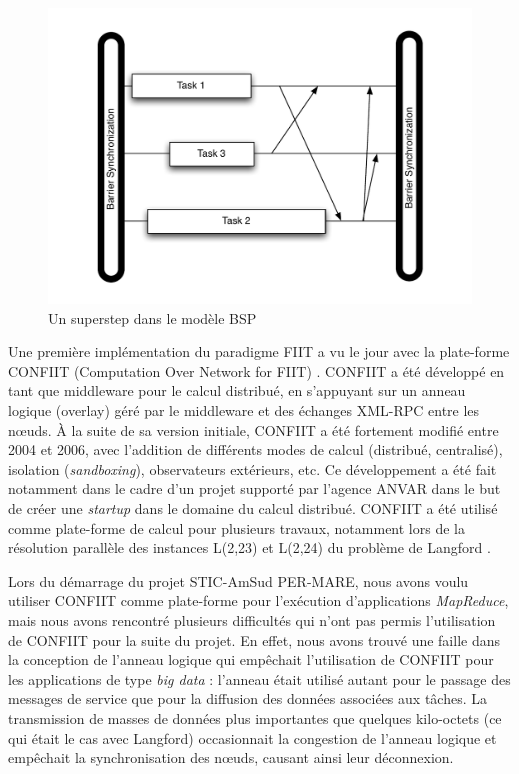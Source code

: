 \begin{figure}
	\centering
		\includegraphics[width=0.5\linewidth]{img/BSP}
		\caption{Un superstep dans le modèle BSP}\label{fig:Superstep}
\end{figure}

Une première implémentation du paradigme FIIT a vu le jour avec la plate-forme CONFIIT (Computation Over Network for FIIT) \cite{FKF03,Flauzac10}. CONFIIT a été développé en tant que middleware pour le calcul distribué, en s'appuyant sur un anneau logique (overlay) géré par le middleware et des échanges XML-RPC entre les n{\oe}uds. À la suite de sa version initiale, CONFIIT a été fortement modifié entre 2004 et 2006, avec l'addition de différents modes de calcul (distribué, centralisé), isolation (\textit{sandboxing}), observateurs extérieurs, etc. Ce développement a été fait notamment dans le cadre d'un projet supporté par l'agence ANVAR dans le but de créer une \textit{startup} dans le domaine du calcul distribué.
CONFIIT a été utilisé comme plate-forme de calcul pour plusieurs travaux, notamment lors de la résolution parallèle des instances L(2,23) et L(2,24) du problème de Langford \cite{JK04}.

Lors du démarrage du projet STIC-AmSud PER-MARE, nous avons voulu utiliser CONFIIT comme plate-forme pour l'exécution d'applications \textit{MapReduce}, mais nous avons rencontré plusieurs difficultés qui n'ont pas permis l'utilisation de CONFIIT pour la suite du projet. En effet, nous avons trouvé une faille dans la conception de l'anneau logique qui empêchait l'utilisation de CONFIIT pour les applications de type \textit{big data} : l'anneau était utilisé autant pour le passage des messages de service que pour la diffusion des données associées aux tâches. La transmission de masses de données plus importantes que quelques kilo-octets (ce qui était le cas avec Langford) occasionnait la congestion de l'anneau logique et empêchait la synchronisation des n{\oe}uds, causant ainsi leur déconnexion.

